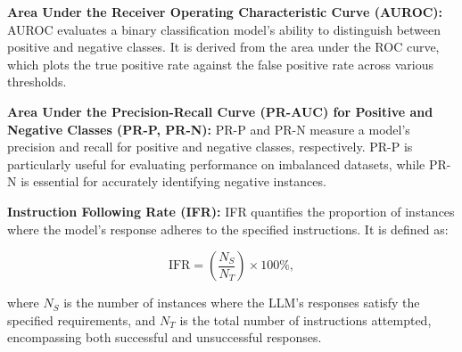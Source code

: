 \textbf{Area Under the Receiver Operating Characteristic Curve (AUROC):} AUROC evaluates a binary classification model’s ability to distinguish between positive and negative classes. It is derived from the area under the ROC curve, which plots the true positive rate against the false positive rate across various thresholds.

\textbf{Area Under the Precision-Recall Curve (PR-AUC) for Positive and Negative Classes (PR-P, PR-N):} PR-P and PR-N measure a model's precision and recall for positive and negative classes, respectively. PR-P is particularly useful for evaluating performance on imbalanced datasets, while PR-N is essential for accurately identifying negative instances.

\textbf{Instruction Following Rate (IFR):} IFR quantifies the proportion of instances where the model's response adheres to the specified instructions. It is defined as:

\[
\text{IFR} = \left( \frac{N_S}{N_T} \right) \times 100\%,
\]

where \( N_S \) is the number of instances where the LLM's responses satisfy the specified requirements, and \( N_T \) is the total number of instructions attempted, encompassing both successful and unsuccessful responses.

